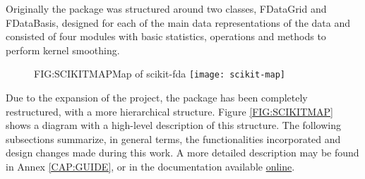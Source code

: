 
Originally the package was structured around two classes, FDataGrid and
FDataBasis, designed for each of the main data representations of the data and
consisted of four modules with basic statistics, operations and methods to
perform kernel smoothing.

\begin{figure}[Map of scikit-fda]{FIG:SCIKITMAP}{Map of scikit-fda \cite{scikitfda}}
	\texttt{[image: scikit-map]}
\end{figure}


Due to the expansion of the project, the package has been completely
restructured, with a more hierarchical structure. Figure \ref{FIG:SCIKITMAP}
shows a diagram with a high-level description of this structure. The following
subsections summarize, in general terms, the functionalities incorporated and
design changes made during this work. A more detailed description may be found
in Annex \ref{CAP:GUIDE}, or in the documentation available \href{https://fda.readthedocs.io/en/latest/}{online}.

